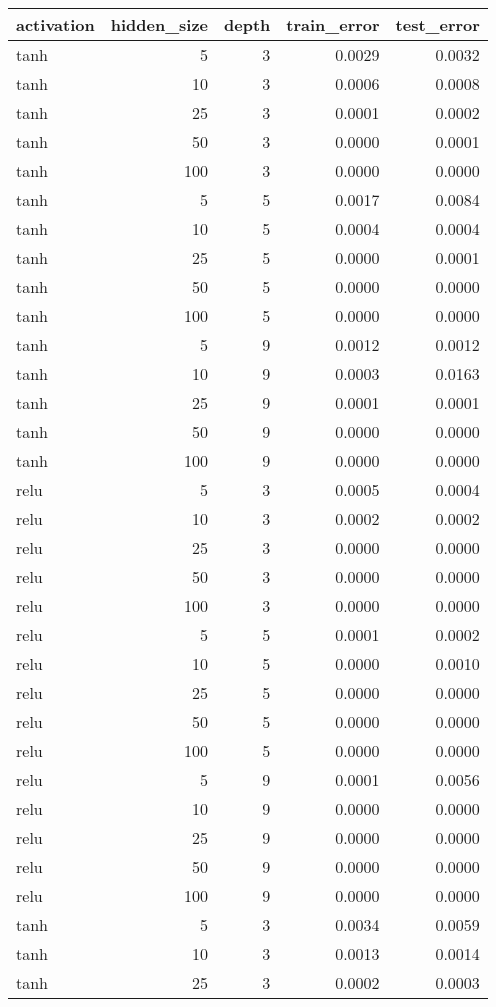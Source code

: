 \begin{tabular}{lrrrr}
\toprule
activation & hidden_size & depth & train_error & test_error \\
\midrule
tanh & 5 & 3 & 0.0029 & 0.0032 \\
tanh & 10 & 3 & 0.0006 & 0.0008 \\
tanh & 25 & 3 & 0.0001 & 0.0002 \\
tanh & 50 & 3 & 0.0000 & 0.0001 \\
tanh & 100 & 3 & 0.0000 & 0.0000 \\
tanh & 5 & 5 & 0.0017 & 0.0084 \\
tanh & 10 & 5 & 0.0004 & 0.0004 \\
tanh & 25 & 5 & 0.0000 & 0.0001 \\
tanh & 50 & 5 & 0.0000 & 0.0000 \\
tanh & 100 & 5 & 0.0000 & 0.0000 \\
tanh & 5 & 9 & 0.0012 & 0.0012 \\
tanh & 10 & 9 & 0.0003 & 0.0163 \\
tanh & 25 & 9 & 0.0001 & 0.0001 \\
tanh & 50 & 9 & 0.0000 & 0.0000 \\
tanh & 100 & 9 & 0.0000 & 0.0000 \\
relu & 5 & 3 & 0.0005 & 0.0004 \\
relu & 10 & 3 & 0.0002 & 0.0002 \\
relu & 25 & 3 & 0.0000 & 0.0000 \\
relu & 50 & 3 & 0.0000 & 0.0000 \\
relu & 100 & 3 & 0.0000 & 0.0000 \\
relu & 5 & 5 & 0.0001 & 0.0002 \\
relu & 10 & 5 & 0.0000 & 0.0010 \\
relu & 25 & 5 & 0.0000 & 0.0000 \\
relu & 50 & 5 & 0.0000 & 0.0000 \\
relu & 100 & 5 & 0.0000 & 0.0000 \\
relu & 5 & 9 & 0.0001 & 0.0056 \\
relu & 10 & 9 & 0.0000 & 0.0000 \\
relu & 25 & 9 & 0.0000 & 0.0000 \\
relu & 50 & 9 & 0.0000 & 0.0000 \\
relu & 100 & 9 & 0.0000 & 0.0000 \\
tanh & 5 & 3 & 0.0034 & 0.0059 \\
tanh & 10 & 3 & 0.0013 & 0.0014 \\
tanh & 25 & 3 & 0.0002 & 0.0003 \\

\end{tabular}
